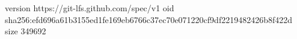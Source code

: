 version https://git-lfs.github.com/spec/v1
oid sha256:efd696a61b3155ed1fe169eb6766c37ec70e071220cf9df2219482426b8f422d
size 349692
